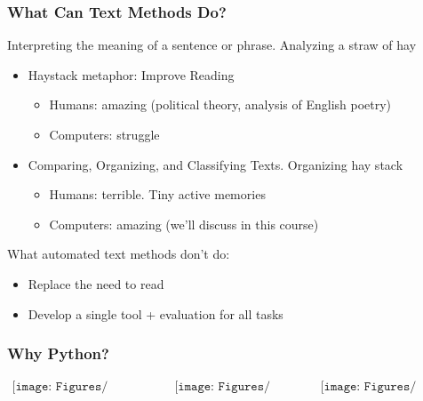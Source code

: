 \documentclass[compress, aspectratio=54]{beamer}
\begin{document}

\begin{frame}
\frametitle{What Can Text Methods Do?}
Interpreting the meaning of a sentence or phrase. Analyzing a straw
of hay 
\begin{itemize}

\item Haystack metaphor: Improve Reading
\begin{itemize}
\item Humans: amazing (political theory, analysis of English
poetry)
\item Computers: struggle
\end{itemize}

\item Comparing, Organizing, and Classifying Texts. Organizing hay stack
\begin{itemize}
\item Humans: terrible. Tiny active memories
\item Computers: amazing (we'll discuss in this course)
\end{itemize}
\end{itemize}

What automated text methods don't do:
\begin{itemize}

\item Replace the need to read
\item Develop a single tool + evaluation for all tasks
\end{itemize}
\end{frame}


\begin{frame}
\frametitle{Why Python?}




\[\begin{array}{ccc}

\texttt{[image: Figures/trends\_languages.png]} &{\texttt{[image: Figures/Economist\_Python3]}}& {\texttt{[image: Figures/Economist\_Python]}} \\

  \end{array}
\]


\end{frame}
\end{document}
